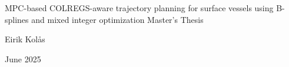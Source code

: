 
\begin{titlepage}
    \begin{center}
        \vspace*{1cm}
        \algrule
        \huge
        MPC-based COLREGS-aware trajectory planning for surface vessels using B-splines and mixed integer optimization
        \algrule
        \LARGE
        Master's Thesis
        \vspace{1.5cm}

        
        \large
        Eirik Kolås

        \vspace{0.2cm}

        June 2025

        \vspace{0.8cm}

        
        \vfill
        
        \vspace{0.8cm}
        
        
        
        
    \end{center}
\end{titlepage}

\cleardoublepage